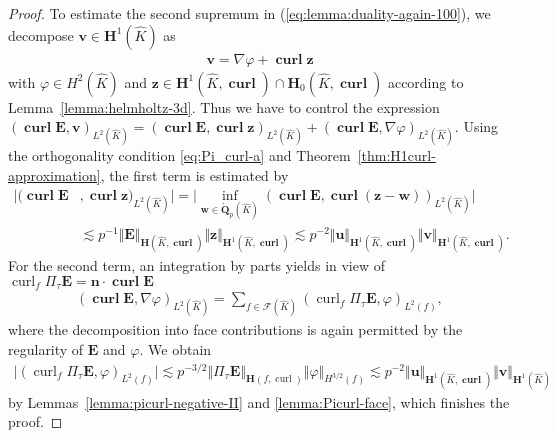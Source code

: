 \documentclass{article}
\begin{document}
\begin{proof}
To estimate the second supremum in (\ref{eq:lemma:duality-again-100}),
we decompose $\mathbf{v}\in\mathbf{H}^1(\widehat{K})$ as
\begin{align*}
\mathbf{v}=\nabla\varphi+\operatorname{\mathbf{curl}}\mathbf{z}
\end{align*}
with $\varphi\in H^2(\widehat{K})$ and $\mathbf{z} \in \mathbf{H}^1(\widehat{K},\operatorname{\mathbf{curl}}) \cap \mathbf{H}_0(\widehat{K},\operatorname{\mathbf{curl}})$ according to Lemma~\ref{lemma:helmholtz-3d}. Thus we have 
to control the expression $(\operatorname{\mathbf{curl}}\mathbf{E},\mathbf{v})_{L^2(\widehat{K})} = (\operatorname{\mathbf{curl}}\mathbf{E},\operatorname{\mathbf{curl}}\mathbf{z})_{L^2(\widehat{K})} + (\operatorname{\mathbf{curl}}\mathbf{E},\nabla\varphi)_{L^2(\widehat{K})}$. Using the orthogonality condition \eqref{eq:Pi_curl-a} and Theorem~\ref{thm:H1curl-approximation}, the first term is estimated by
\begin{align*}
\bigr| (\operatorname{\mathbf{curl}}\mathbf{E}&,\operatorname{\mathbf{curl}}\mathbf{z})_{L^2(\widehat{K})} 
\bigr| =\bigl| \operatorname*{inf}_{\mathbf{w}\in\mathring{\mathbf{Q}}_p(\widehat{K})} (\operatorname{\mathbf{curl}}\mathbf{E},\operatorname{\mathbf{curl}}(\mathbf{z}-\mathbf{w}))_{L^2(\widehat{K})} \bigr| \\
& \lesssim p^{-1} \Vert\mathbf{E}\Vert_{\mathbf{H}(\widehat{K},\operatorname{\mathbf{curl}})} \Vert\mathbf{z}\Vert_{\mathbf{H}^1(\widehat{K},\operatorname{\mathbf{curl}})} 
\lesssim p^{-2} \Vert\mathbf{u}\Vert_{\mathbf{H}^1(\widehat{K},\operatorname{\mathbf{curl}})} \Vert\mathbf{v}\Vert_{\mathbf{H}^1(\widehat{K},\operatorname{\mathbf{curl}})}.
\end{align*}
For the second term, an integration by parts yields in view of 
$\operatorname{curl}_f \Pi_\tau {\mathbf E} = {\mathbf n} \cdot \operatorname{\mathbf{curl}} {\mathbf E}$ 
\begin{align*}
(\operatorname{\mathbf{curl}}\mathbf{E},\nabla\varphi)_{L^2(\widehat{K})} = \sum_{f\in\mathcal{F}(\widehat{K})}(\operatorname{curl}_f\Pi_\tau\mathbf{E},\varphi)_{L^2(f)},
\end{align*}
where the decomposition into face contributions is again permitted by the regularity of ${\mathbf E}$ and $\varphi$. 
We obtain
\begin{align*}
\bigl| (\operatorname{curl}_f\Pi_\tau\mathbf{E},\varphi)_{L^2(f)}\bigr|\! \lesssim p^{-3/2} \Vert\Pi_\tau\mathbf{E}\Vert_{\mathbf{H}(f,\operatorname{curl})} \Vert\varphi\Vert_{H^{3/2}(f)}\! \lesssim p^{-2} \Vert\mathbf{u}\Vert_{\mathbf{H}^1(\widehat{K},\operatorname{\mathbf{curl}})} \Vert\mathbf{v}\Vert_{\mathbf{H}^1(\widehat{K})}
\end{align*}
by Lemmas~\ref{lemma:picurl-negative-II} and \ref{lemma:Picurl-face}, which finishes the proof.
\end{proof}
\end{document}
